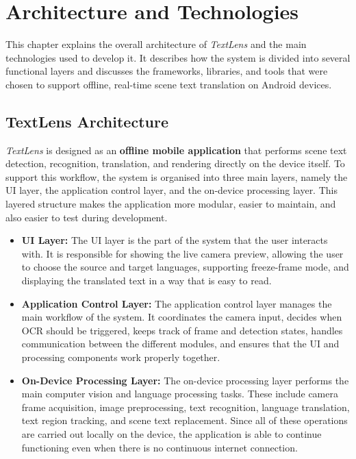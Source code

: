 \chapter{Architecture and Technologies}

This chapter explains the overall architecture of \textit{TextLens} and the main technologies used to develop it. It describes how the system is divided into several functional layers and discusses the frameworks, libraries, and tools that were chosen to support offline, real-time scene text translation on Android devices.

\section{TextLens Architecture}

\textit{TextLens} is designed as an \textbf{offline mobile application} that performs scene text detection, recognition, translation, and rendering directly on the device itself. To support this workflow, the system is organised into three main layers, namely the UI layer, the application control layer, and the on-device processing layer. This layered structure makes the application more modular, easier to maintain, and also easier to test during development.

\begin{itemize}
    \item \textbf{UI Layer:}  
    The UI layer is the part of the system that the user interacts with. It is responsible for showing the live camera preview, allowing the user to choose the source and target languages, supporting freeze-frame mode, and displaying the translated text in a way that is easy to read.

    \item \textbf{Application Control Layer:}  
    The application control layer manages the main workflow of the system. It coordinates the camera input, decides when OCR should be triggered, keeps track of frame and detection states, handles communication between the different modules, and ensures that the UI and processing components work properly together.

    \item \textbf{On-Device Processing Layer:}  
    The on-device processing layer performs the main computer vision and language processing tasks. These include camera frame acquisition, image preprocessing, text recognition, language translation, text region tracking, and scene text replacement. Since all of these operations are carried out locally on the device, the application is able to continue functioning even when there is no continuous internet connection.
\end{itemize}

